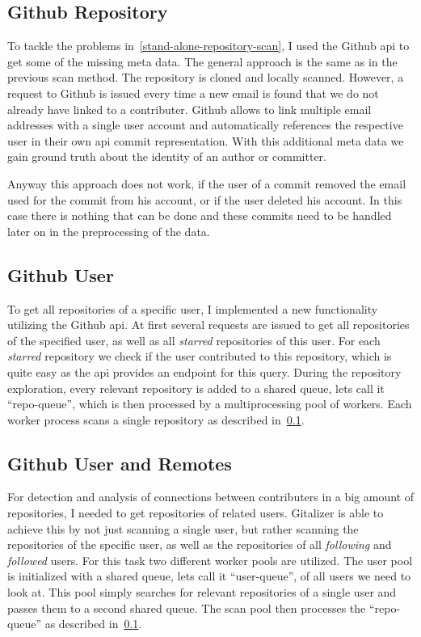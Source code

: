 \subsection{Github Repository}\label{github-repo-scan}
To tackle the problems in~\ref{stand-alone-repository-scan}, I used the Github \ac{api} to get some of the missing meta data.
The general approach is the same as in the previous scan method. The repository is cloned and locally scanned.
However, a request to Github is issued every time a new email is found that we do not already have linked to a contributer.
Github allows to link multiple email addresses with a single user account and automatically references the respective user in their own \ac{api} commit representation.
With this additional meta data we gain ground truth about the identity of an author or committer.

Anyway this approach does not work, if the user of a commit removed the email used for the commit from his account, or if the user deleted his account.
In this case there is nothing that can be done and these commits need to be handled later on in the preprocessing of the data.


\subsection{Github User}\label{github-user-scan}
To get all repositories of a specific user, I implemented a new functionality utilizing the Github \ac{api}.
At first several requests are issued to get all repositories of the specified user, as well as all \emph{starred} repositories of this user.
For each \emph{starred} repository we check if the user contributed to this repository, which is quite easy as the \ac{api} provides an endpoint for this query.
During the repository exploration, every relevant repository is added to a shared queue, lets call it ``repo-queue'', which is then processed by a multiprocessing pool of workers.
Each worker process scans a single repository as described in~\ref{github-repo-scan}.


\subsection{Github User and Remotes}\label{github-user-remote-scan}
For detection and analysis of connections between contributers in a big amount of repositories, I needed to get repositories of related users.
Gitalizer is able to achieve this by not just scanning a single user, but rather scanning the repositories of the specific user, as well as the repositories of all \emph{following} and \emph{followed} users.
For this task two different worker pools are utilized.
The user pool is initialized with a shared queue, lets call it ``user-queue'', of all users we need to look at.
This pool simply searches for relevant repositories of a single user and passes them to a second shared queue.
The scan pool then processes the ``repo-queue'' as described in~\ref{github-repo-scan}.


